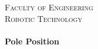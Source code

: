 \begin{titlepage}
\begin{center}




\textsc{\huge \color{sdu_grey} Faculty of Engineering}\\[0.5cm]

\textsc{\LARGE \color{sdu_grey} Robotic Technology}\\[0.5cm]

\HRule \\[1ex]
{ \Huge \bfseries Pole Position \\[1ex] }

\HRule \\[1.5cm]


\end{center}
\end{titlepage}
